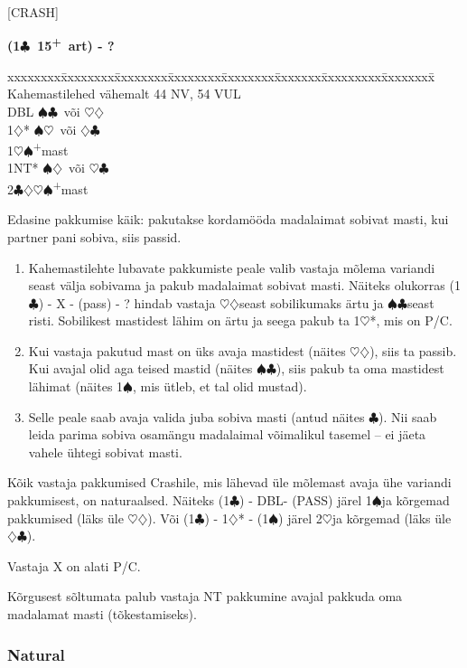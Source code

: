 \documentclass[10pt]{article}
\renewcommand{\c}{$\clubsuit$}
\renewcommand{\d}{$\diamondsuit$}
\newcommand{\h}{$\heartsuit$}
\newcommand{\s}{$\spadesuit$}
\newcommand{\p}{\textsuperscript{+}}
\newcommand{\x}{DBL}
\newenvironment{bidtable}[1][]
{\textbf{#1}
  \begin{adjustwidth}{1em}{}
    \addvspace{2pt}
    \begin{tabbing}
      xxxxxxxx\=xxxxxxxx\=xxxxxxxx\=xxxxxxxx\=xxxxxxxx\=xxxxxxx\=xxxxxxxxx\=xxxxxxxx\=\kill}
{\end{tabbing}\end{adjustwidth}\bigskip}%
\begin{document}
[CRASH]

\begin{bidtable}[(1\c\ 15\p\ art) - ?]
Kahemastilehed vähemalt 44 NV, 54 VUL \\
\x        \> \s\c\ või \h\d\          \\
1\d*      \> \s\h\ või \d\c           \\
1\h\s     {}\p mast                 \\
1NT*      \> \s\d\ või \h\c\          \\
2\c\d\h\s {}\p mast
\end{bidtable}

Edasine pakkumise käik: pakutakse kordamööda madalaimat sobivat masti, kui partner pani sobiva, siis passid.
\begin{enumerate}
\item Kahemastilehte lubavate pakkumiste peale valib vastaja mõlema variandi seast välja sobivama ja pakub madalaimat sobivat masti. Näiteks olukorras (1\c) - X - (pass) - ? hindab vastaja \h\d seast sobilikumaks ärtu ja \s\c seast risti. Sobilikest mastidest lähim on ärtu ja seega pakub ta 1\h*, mis on P/C.
\item  Kui vastaja pakutud mast on üks avaja mastidest (näites \h\d), siis ta passib. Kui avajal olid aga teised mastid (näites \s\c), siis pakub ta oma mastidest lähimat (näites 1\s, mis ütleb, et tal olid mustad).
\item  Selle peale saab avaja valida juba sobiva masti (antud näites \c). Nii saab leida parima sobiva osamängu madalaimal võimalikul tasemel – ei jäeta vahele ühtegi sobivat masti.
\end{enumerate}
Kõik vastaja pakkumised Crashile, mis lähevad üle mõlemast avaja ühe variandi pakkumisest, on naturaalsed. Näiteks (1\c) - \x - (PASS) järel 1\s ja kõrgemad pakkumised (läks üle \h\d). Või (1\c) - 1\d* - (1\s) järel 2\h ja kõrgemad (läks üle \d\c).

Vastaja X on alati P/C.

Kõrgusest sõltumata palub vastaja NT pakkumine avajal pakkuda oma madalamat masti (tõkestamiseks).

\subsubsection{Natural}
\end{document}
